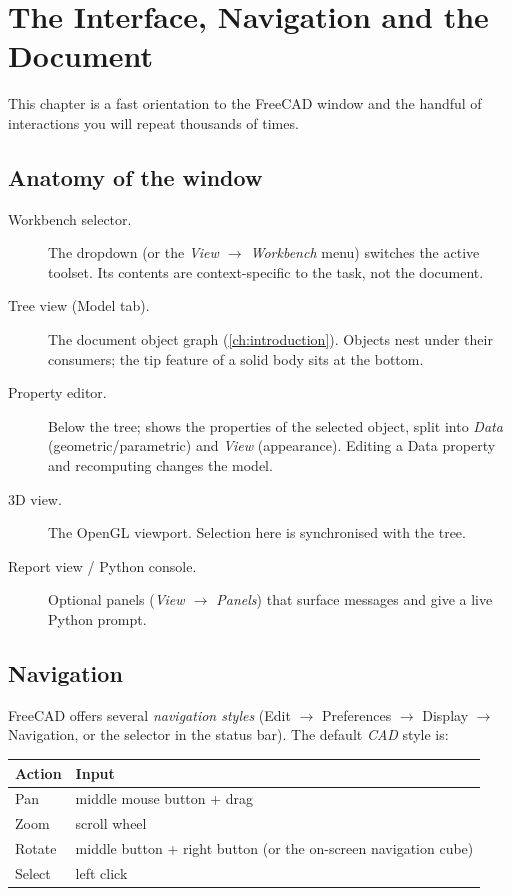 \chapter{The Interface, Navigation and the Document}
\label{ch:interface}

This chapter is a fast orientation to the FreeCAD window and the handful
of interactions you will repeat thousands of times.

\section{Anatomy of the window}

\begin{description}
  \item[Workbench selector.] The dropdown (or the \emph{View
        $\rightarrow$ Workbench} menu) switches the active toolset. Its
        contents are context-specific to the task, not the document.
  \item[Tree view (Model tab).] The document object graph
        (\cref{ch:introduction}). Objects nest under their consumers;
        the tip feature of a solid body sits at the bottom.
  \item[Property editor.] Below the tree; shows the properties of the
        selected object, split into \emph{Data} (geometric/parametric)
        and \emph{View} (appearance). Editing a Data property and
        recomputing changes the model.
  \item[3D view.] The OpenGL viewport. Selection here is synchronised
        with the tree.
  \item[Report view / Python console.] Optional panels (\emph{View
        $\rightarrow$ Panels}) that surface messages and give a live
        Python prompt.
\end{description}

\section{Navigation}

FreeCAD offers several \emph{navigation styles} (Edit $\rightarrow$
Preferences $\rightarrow$ Display $\rightarrow$ Navigation, or the
selector in the status bar). The default \emph{CAD} style is:

\begin{center}
\begin{tabularx}{\linewidth}{lX}
  \toprule
  Action & Input \\
  \midrule
  Pan    & middle mouse button + drag \\
  Zoom   & scroll wheel \\
  Rotate & middle button + right button (or the on-screen navigation cube) \\
  Select & left click \\
  \bottomrule
\end{tabularx}
\end{center}

